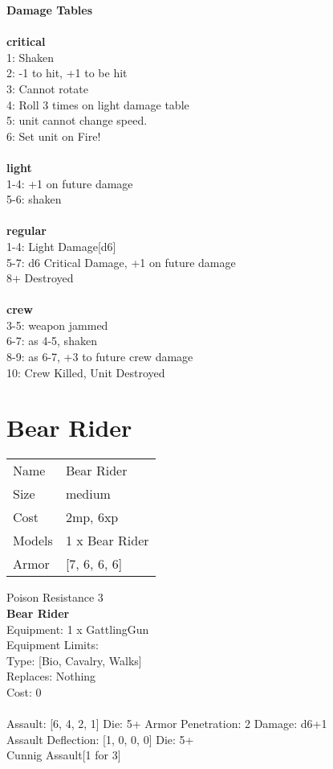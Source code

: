 {\bf Damage Tables} \\
\ \\ {\bf critical } \\
1: Shaken \\
2: -1 to hit, +1 to be hit \\
3: Cannot rotate \\
4: Roll 3 times on light damage table \\
5: unit cannot change speed. \\
6: Set unit on Fire! \\
\ \\ {\bf light } \\
1-4: +1 on future damage \\
5-6: shaken \\
\ \\ {\bf regular } \\
1-4: Light Damage[d6] \\
5-7: d6 Critical Damage, +1 on future damage \\
8+ Destroyed \\
\ \\ {\bf crew } \\
3-5: weapon jammed \\
6-7: as 4-5, shaken \\
8-9: as 6-7, +3 to future crew damage \\
10: Crew Killed, Unit Destroyed \\










\pagebreak\pagebreak

\section{ Bear Rider }

\begin{tabular}{ll}
  Name & Bear Rider \\
  Size & medium\\
  Cost & 2mp, 6xp\\
  Models & 1 x Bear Rider\\
  Armor & [7, 6, 6, 6]\\
\end{tabular}

\noindent Poison Resistance 3\\ 


{\bf Bear Rider } \\
Equipment: 1 x GattlingGun \\
Equipment Limits:  \\
Type: [Bio, Cavalry, Walks] \\
Replaces: Nothing \\
Cost: 0\\
\ \\
Assault: [6, 4, 2, 1] Die: 5+ Armor Penetration: 2 Damage: d6+1 \\
Assault Deflection: [1, 0, 0, 0] Die: 5+\\
\indent Cunnig Assault[1 for 3]\\ 
 

